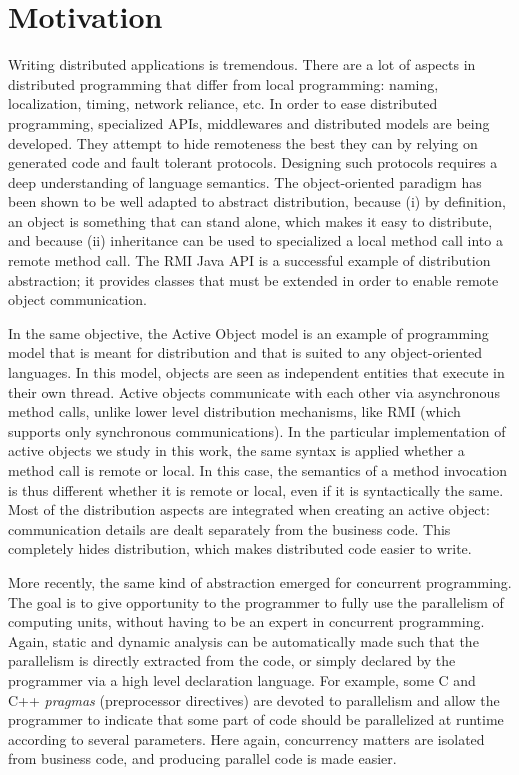 \documentclass[11pt]{report}
\begin{document}
\section{Motivation}
Writing distributed applications is tremendous. There are a lot of aspects in distributed programming that differ from local programming: naming, localization, timing, network reliance, etc. In order to ease distributed programming, specialized APIs, middlewares and distributed models are being developed. They attempt to hide remoteness the best they can by relying on generated code and fault tolerant protocols. Designing such protocols requires a deep understanding of language semantics. The object-oriented paradigm has been shown to be well adapted to abstract distribution, because (i) by definition, an object is something that can stand alone, which makes it easy to distribute, and because (ii) inheritance can be used to specialized a local method call into a remote method call. The RMI Java API \cite{ref:rmi} is a successful example of distribution abstraction; it provides classes that must be extended in order to enable remote object communication. 

In the same objective, the Active Object model \cite{ref:Lavender95activeobject} is an example of programming model that is meant for distribution and that is suited to any object-oriented languages. In this model, objects are seen as independent entities that execute in their own thread. Active objects communicate with each other via asynchronous method calls, unlike lower level distribution mechanisms, like RMI (which supports only synchronous communications).
In the particular implementation of active objects we study in this work, the same syntax is applied whether a method call is remote or local. In this case, the semantics of a method invocation is thus different whether it is remote or local, even if it is syntactically the same. Most of the distribution aspects are integrated when creating an active object: communication details are dealt separately from the business code. This completely hides distribution, which makes distributed code easier to write. 

More recently, the same kind of abstraction emerged for concurrent programming. The goal is to give opportunity to the programmer to fully use the parallelism of computing units, without having to be an expert in concurrent programming. Again, static and dynamic analysis can be automatically made such that the parallelism is directly extracted from the code, or simply declared by the programmer via a high level declaration language. For example, some C and C++ \emph{pragmas} (preprocessor directives) \cite{ref:openmp} are devoted to parallelism and allow the programmer to indicate that some part of code should be parallelized at runtime according to several parameters. Here again, concurrency matters are isolated from business code, and producing parallel code is made easier.
\end{document}
